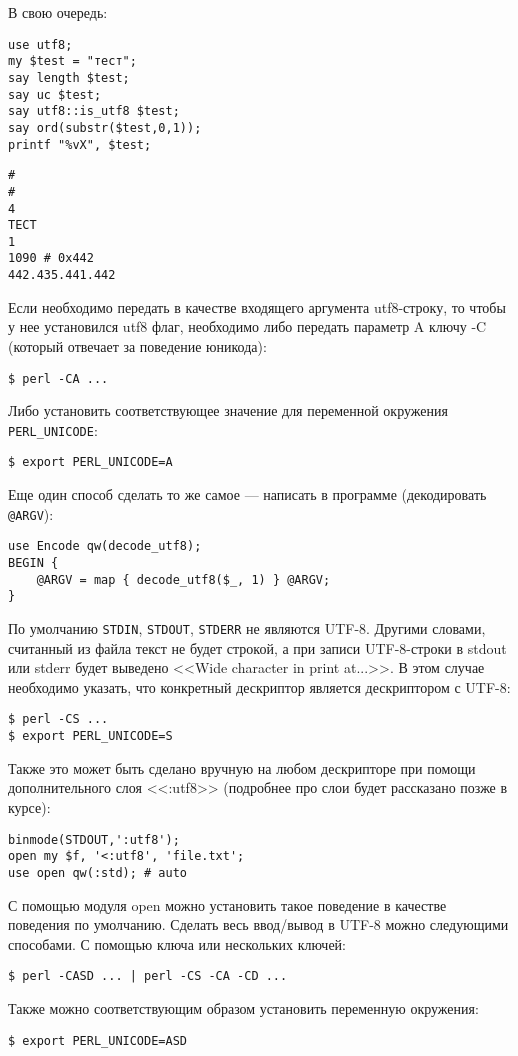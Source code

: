 В свою очередь:
\begin{verbatim}
use utf8;
my $test = "тест";
say length $test;
say uc $test;
say utf8::is_utf8 $test;
say ord(substr($test,0,1));
printf "%vX", $test;
\end{verbatim}
\begin{verbatim}
#
#
4
ТЕСТ
1
1090 # 0x442
442.435.441.442
\end{verbatim}

Если необходимо передать в качестве входящего аргумента utf8-строку, то чтобы у нее установился utf8 флаг, необходимо либо передать параметр A ключу -C (который отвечает за поведение юникода):
\begin{verbatim}
$ perl -CA ...
\end{verbatim}
Либо установить соответствующее значение для переменной окружения \verb|PERL_UNICODE|:
\begin{verbatim}
$ export PERL_UNICODE=A
\end{verbatim}
Еще один способ сделать то же самое --- написать в программе (декодировать \verb|@ARGV|):
\begin{verbatim}
use Encode qw(decode_utf8);
BEGIN {
    @ARGV = map { decode_utf8($_, 1) } @ARGV;
}
\end{verbatim}
По умолчанию \verb|STDIN|, \verb|STDOUT|, \verb|STDERR| не являются UTF-8. Другими словами, считанный из файла текст не будет строкой, а при записи UTF-8-строки в stdout или stderr будет выведено <<Wide character in print at...>>. В этом случае необходимо указать, что конкретный дескриптор является дескриптором с UTF-8:
\begin{verbatim}
$ perl -CS ...
$ export PERL_UNICODE=S
\end{verbatim}
Также это может быть сделано вручную на любом дескрипторе при помощи дополнительного слоя <<:utf8>> (подробнее про слои будет рассказано позже в курсе):
\begin{verbatim}
binmode(STDOUT,':utf8');
open my $f, '<:utf8', 'file.txt';
use open qw(:std); # auto
\end{verbatim}
С помощью модуля open можно установить такое поведение в качестве поведения по умолчанию. Сделать весь ввод/вывод в UTF-8 можно следующими способами. С помощью ключа или нескольких ключей:
\begin{verbatim}
$ perl -CASD ... | perl -CS -CA -CD ...
\end{verbatim}
Также можно соответствующим образом установить переменную окружения:
\begin{verbatim}
$ export PERL_UNICODE=ASD
\end{verbatim}
